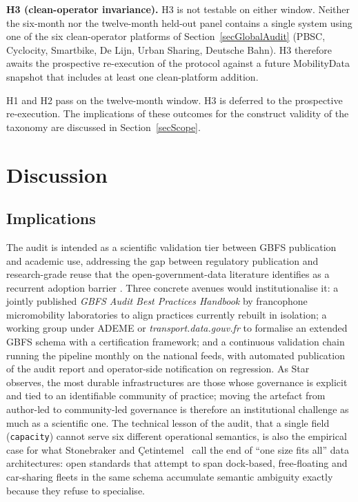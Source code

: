 \documentclass[11pt,a4paper]{article}
\begin{document}
\textbf{H3 (clean-operator invariance).} H3 is not
testable on either window. Neither the six-month nor the
twelve-month held-out panel contains a single system using one
of the six clean-operator platforms of
Section~\ref{secGlobalAudit} (PBSC, Cyclocity, Smartbike,
De Lijn, Urban Sharing, Deutsche Bahn). H3 therefore awaits
the prospective re-execution of the protocol against a future
MobilityData snapshot that includes at least one clean-platform
addition.

H1 and H2 pass on the twelve-month window. H3 is deferred to the
prospective re-execution. The implications of these outcomes for
the construct validity of the taxonomy are discussed in
Section~\ref{secScope}.


\section{Discussion}\label{secDiscussion}

\subsection{Implications}
The audit is intended as a scientific validation tier between GBFS
publication and academic use, addressing the gap between regulatory
publication and research-grade reuse that the open-government-data
literature identifies as a recurrent adoption barrier
\cite{Janssen2012OpenData}. Three concrete avenues would
institutionalise it: a jointly published \emph{GBFS Audit Best
Practices Handbook} by francophone micromobility laboratories to
align practices currently rebuilt in isolation; a working group
under ADEME or \emph{transport.data.gouv.fr} to formalise an
extended GBFS schema with a certification framework; and a
continuous validation chain running the pipeline monthly on the
national feeds, with automated publication of the audit report and
operator-side notification on regression. As Star~\cite{Star2010}
observes, the most durable infrastructures are those whose
governance is explicit and tied to an identifiable community of
practice; moving the artefact from author-led to community-led
governance is therefore an institutional challenge as much as a
scientific one. The technical lesson of the audit, that a single
field (\texttt{capacity}) cannot serve six different operational
semantics, is also the empirical case for what Stonebraker and
\c{C}etintemel~\cite{Stonebraker2005OneSize} call the end of
``one size fits all'' data architectures: open standards that
attempt to span dock-based, free-floating and car-sharing fleets in
the same schema accumulate semantic ambiguity exactly because they
refuse to specialise.
\end{document}

